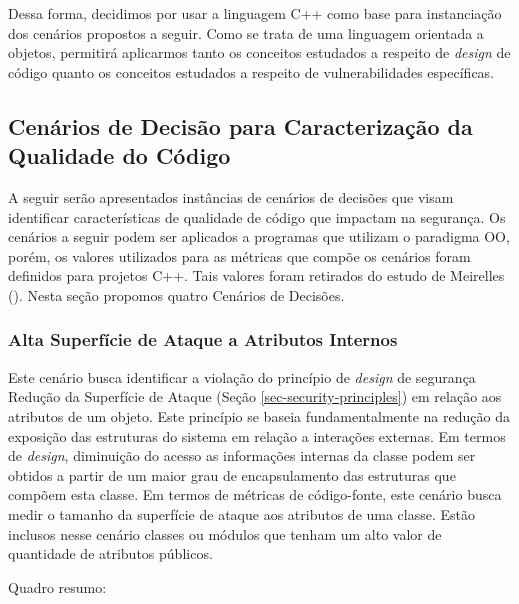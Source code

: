 Dessa forma, decidimos por usar a linguagem C++ como base para instanciação dos cenários propostos a seguir. Como se trata de uma linguagem orientada a objetos, permitirá aplicarmos tanto os conceitos estudados a respeito de \emph{design} de código quanto os conceitos estudados a respeito de vulnerabilidades específicas.

\subsection{Cenários de Decisão para Caracterização da Qualidade do Código }
\label{cenarios-design}

A seguir serão apresentados instâncias de cenários de decisões que visam identificar características de qualidade de código que impactam na segurança. Os cenários a seguir podem ser aplicados a programas que utilizam o paradigma OO, porém, os valores utilizados para as métricas que compõe os cenários foram definidos para projetos C++. Tais valores foram retirados do estudo de Meirelles (\citeyear{meirelles2013metrics}). Nesta seção propomos quatro Cenários de Decisões. 

\subsubsection{Alta Superfície de Ataque a Atributos Internos}

Este cenário busca identificar a violação do princípio de \emph{design} de segurança Redução da Superfície de Ataque (Seção \ref{sec-security-principles}) em relação aos atributos de um objeto. 
%
Este princípio se baseia fundamentalmente na redução da exposição das estruturas do sistema em relação a interações externas. Em termos de \emph{design}, diminuição do acesso as informações internas da classe podem ser obtidos a partir de um maior grau de encapsulamento das estruturas que compõem esta classe. 
%
Em termos de métricas de código-fonte, este cenário busca medir o tamanho da superfície de ataque aos atributos de uma classe. Estão inclusos nesse cenário classes ou módulos que tenham um alto valor de quantidade de atributos públicos. 

%

Quadro resumo:

